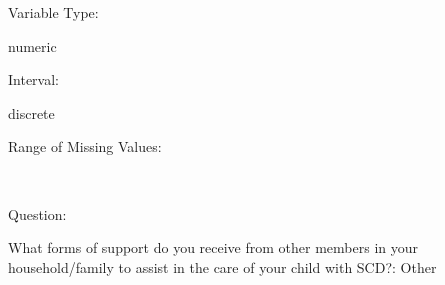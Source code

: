 \documentclass[
]{article}
\begin{document}
\begin{minipage}[t]{0.3\linewidth}

Variable Type:

\end{minipage}%
\begin{minipage}[t]{0.7\linewidth}

numeric

\end{minipage}

\begin{minipage}[t]{0.3\linewidth}

Interval:

\end{minipage}%
\begin{minipage}[t]{0.7\linewidth}

discrete

\end{minipage}

\begin{minipage}[t]{0.3\linewidth}

Range of Missing Values:

\end{minipage}%
\begin{minipage}[t]{0.7\linewidth}

~

\end{minipage}

\begin{minipage}[t]{0.3\linewidth}

Question:

\end{minipage}%
\begin{minipage}[t]{0.7\linewidth}

What forms of support do you receive from other members in your
household/family to assist in the care of your child with SCD?: Other

\end{minipage}
\end{document}

